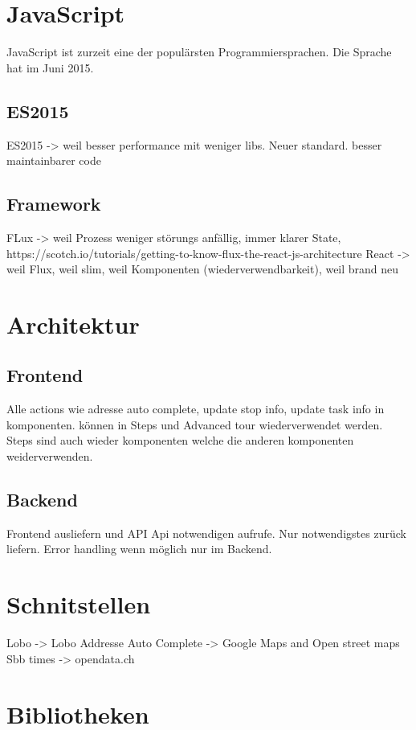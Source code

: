 \section{JavaScript}
JavaScript ist zurzeit eine der populärsten Programmiersprachen. Die Sprache hat im Juni 2015.
\subsection{ES2015}
ES2015 -> weil besser performance mit weniger libs. Neuer standard. besser maintainbarer code

\subsection{Framework}
FLux -> weil Prozess weniger störungs anfällig, immer klarer State,
https://scotch.io/tutorials/getting-to-know-flux-the-react-js-architecture
React -> weil Flux, weil slim, weil Komponenten (wiederverwendbarkeit), weil brand neu


\section{Architektur}


\subsection{Frontend}
Alle actions wie adresse auto complete, update stop info, update task info in komponenten. können in Steps und Advanced tour wiederverwendet werden. Steps sind auch wieder komponenten welche die anderen komponenten weiderverwenden.

\subsection{Backend}
Frontend ausliefern und API
Api notwendigen aufrufe. Nur notwendigstes zurück liefern. Error handling wenn möglich nur im Backend.

\section{Schnitstellen}
Lobo -> Lobo
Addresse Auto Complete -> Google Maps and Open street maps
Sbb times -> opendata.ch


\section{Bibliotheken}










